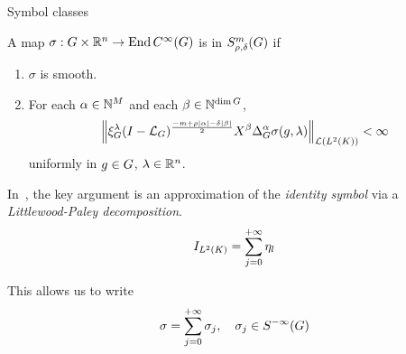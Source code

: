 \documentclass[handout]{beamer}
\begin{document}
\begin{frame}{Symbol classes}
    \begin{definition}
        A map $\sigma: G \times \mathbb{R}^n \to \operatorname{End} {{C^\infty(G)}}$ is in $S^{m}_{\rho, \delta}(G)$ if
        \begin{enumerate}
            \item
                $\sigma$ is smooth.
            \item
                For each $\alpha \in \mathbb{N}^M$ and each $\beta \in \mathbb{N}^{\dim G}$,
                \begin{align*}
                    \norm [\Lin {\Lebesgue 2 \CompactGroup}] {
                        \Rep \lambda \BesselPotential {-m + \rho \abs \alpha - \delta \abs \beta}
                        \LeftDifferentialOperator \beta \DifferenceOperatorOrder \alpha \sigma(g, \lambda)
                    } < \infty
                \end{align*}
                uniformly in $g \in G$, $\lambda \in \mathbb{R}^n$.
        \end{enumerate}
    \end{definition}
\end{frame}

\begin{frame}
    In~\cite{Fischer2015,FischerRuzhansky16},
    the key argument is an approximation of the \emph{identity symbol} via a \emph{Littlewood-Paley decomposition}.
    \begin{align*}
        {I_{{L^{2} (K)}}} = \sum_{j = 0}^{+ \infty} \eta_l
    \end{align*}

    This allows us to write
    \begin{align*}
        \sigma = \sum_{j = 0}^{+ \infty} \sigma_j,
        \quad
        \sigma_j \in {S^{-\infty} (G)}
    \end{align*}
\end{frame}
\end{document}
